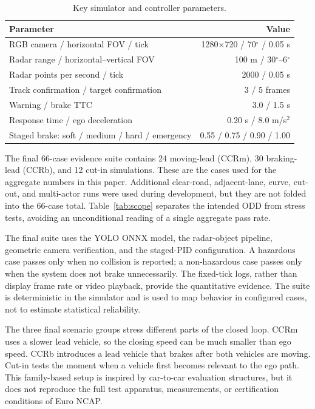 \documentclass[conference]{IEEEtran}
\begin{document}
\begin{table}[t]
\caption{Key simulator and controller parameters.}
\label{tab:config}
\centering
\footnotesize
\begin{tabular}{p{}r}
\toprule
Parameter & Value \\
\midrule
RGB camera / horizontal FOV / tick & 1280$\times$720 / 70$^\circ$ / 0.05 s \\
Radar range / horizontal--vertical FOV & 100 m / 30$^\circ$--6$^\circ$ \\
Radar points per second / tick & 2000 / 0.05 s \\
Track confirmation / target confirmation & 3 / 5 frames \\
Warning / brake TTC & 3.0 / 1.5 s \\
Response time / ego deceleration & 0.20 s / 8.0 m/s$^2$ \\
Staged brake: soft / medium / hard / emergency & 0.55 / 0.75 / 0.90 / 1.00 \\
\bottomrule
\end{tabular}
\end{table}

The final 66-case evidence suite contains 24 moving-lead (CCRm), 30 braking-lead
(CCRb), and 12 cut-in simulations. These are the cases used for the aggregate
numbers in this paper. Additional clear-road, adjacent-lane, curve, cut-out, and
multi-actor runs were used during development, but they are not folded into the
66-case total. Table~\ref{tab:scope} separates the intended ODD from stress
tests, avoiding an unconditional reading of a single aggregate pass rate.

The final suite uses the YOLO ONNX model, the radar-object pipeline, geometric
camera verification, and the staged-PID configuration. A hazardous case passes
only when no collision is reported; a non-hazardous case passes only when the
system does not brake unnecessarily. The fixed-tick logs, rather than display
frame rate or video playback, provide the quantitative evidence. The suite is
deterministic in the simulator and is used to map behavior in configured cases,
not to estimate statistical reliability.

The three final scenario groups stress different parts of the closed loop. CCRm
uses a slower lead vehicle, so the closing speed can be much smaller than ego
speed. CCRb introduces a lead vehicle that brakes after both vehicles are
moving. Cut-in tests the moment when a vehicle first becomes relevant to the ego
path. This family-based setup is inspired by car-to-car evaluation structures,
but it does not reproduce the full test apparatus, measurements, or certification
conditions of Euro NCAP.
\end{document}

